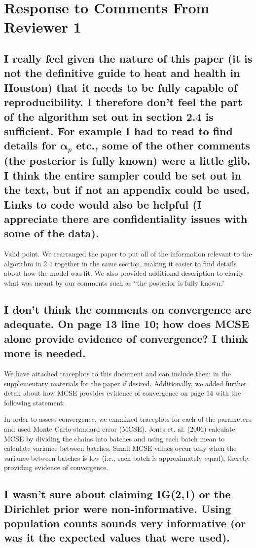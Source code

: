 \documentclass{article}
\begin{document}
\section{Response to Comments From Reviewer 1}
\subsection{I really feel given the nature of this paper (it is not the definitive guide to heat and health in Houston) that it needs to be fully capable of reproducibility.   I therefore don't feel the part of the algorithm set out in section 2.4 is sufficient.   For example I had to read to find details for $\boldsymbol{\alpha}_p$ etc., some of the other comments (the posterior is fully known) were a little glib.   I think the entire sampler could be set out in the text, but if not an appendix could be used.   Links to code would also be helpful (I appreciate there are confidentiality issues with some of the data).}

Valid point. We rearranged the paper to put all of the information relevant to the algorithm in 2.4 together in the same section, making it easier to find details about how the model was fit. We also provided additional description to clarify what was meant by our comments such as ``the posterior is fully known.''

\subsection{I don't think the comments on convergence are adequate.   On page 13 line 10; how does MCSE alone provide evidence of convergence?   I think more is needed.}
We have attached traceplots to this document and can include them in the supplementary materials for the paper if desired. Additionally, we added further detail about how MCSE provides evidence of convergence on page 14 with the following statement:

\begin{displayquote}
In order to assess convergence, we examined traceplots for each of the parameters and used Monte Carlo standard error (MCSE). Jones et. al. (2006) calculate MCSE by dividing the chains into batches and using each batch mean to calculate variance between batches. Small MCSE values occur only when the variance between batches is low (i.e., each batch is approximately equal), thereby providing evidence of convergence.
\end{displayquote}

\subsection{I wasn't sure about claiming IG(2,1) or the Dirichlet prior were non-informative.   Using population counts sounds very informative (or was it the expected values that were used).}
\end{document}
